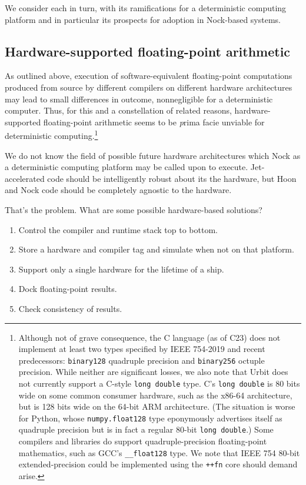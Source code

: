\documentclass[twoside]{article}
\begin{document}
We consider each in turn, with its ramifications for a deterministic computing platform and in particular its prospects for adoption in Nock-based systems.

\subsection{Hardware-supported floating-point arithmetic}

As outlined above, execution of software-equivalent floating-point computations produced from source by different compilers on different hardware architectures may lead to small differences in outcome, nonnegligible for a deterministic computer.  Thus, for this and a constellation of related reasons, hardware-supported floating-point arithmetic seems to be {\emph prima facie} unviable for deterministic computing.\footnote{Although not of grave consequence, the C language (as of C23) does not implement at least two types specified by IEEE 754-2019 and recent predecessors:  \texttt{binary128} quadruple precision and \texttt{binary256} octuple precision.  While neither are significant losses, we also note that Urbit does not currently support a C-style \texttt{long double} type.  C's \texttt{long double} is 80 bits wide on some common consumer hardware, such as the x86-64 architecture, but is 128 bits wide on the 64-bit ARM architecture.  (The situation is worse for Python, whose \texttt{numpy.float128} type eponymously advertises itself as quadruple precision but is in fact a regular 80-bit \texttt{long double}.)  Some compilers and libraries do support quadruple-precision floating-point mathematics, such as GCC's \texttt{\_\_float128} type.  We note that IEEE 754 80-bit extended-precision could be implemented using the \texttt{++fn} core should demand arise.}

We do not know the field of possible future hardware architectures which Nock as a deterministic computing platform may be called upon to execute.  Jet-accelerated code should be intelligently robust about its the hardware, but Hoon and Nock code should be completely agnostic to the hardware.

That's the problem.  What are some possible hardware-based solutions?

\begin{enumerate}
  \item  Control the compiler and runtime stack top to bottom.
  \item  Store a hardware and compiler tag and simulate when not on that platform.
  \item  Support only a single hardware for the lifetime of a ship.
  \item  Dock floating-point results.
  \item  Check consistency of results.
\end{enumerate}
\end{document}
